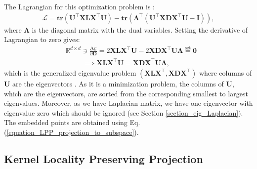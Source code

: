 \documentclass[lang=cn,10pt]{gorgeousnbook}
\numberwithin{equation}{section}%
\numberwithin{figure}{section}%
\begin{document}
The Lagrangian for this optimization problem is \cite{boyd2004convex}:
\begin{align*}
\mathcal{L} = \textbf{tr}(\boldsymbol{U}^\top \boldsymbol{X} \boldsymbol{L} \boldsymbol{X}^\top \boldsymbol{U}) - \textbf{tr}(\boldsymbol{\Lambda}^\top (\boldsymbol{U}^\top \boldsymbol{X} \boldsymbol{D} \boldsymbol{X}^\top \boldsymbol{U} - \boldsymbol{I})),
\end{align*}
where $\boldsymbol{\Lambda}$ is the diagonal matrix with the dual variables. Setting the derivative of Lagrangian to zero gives:
\begin{align}
&\mathbb{R}^{d \times d} \ni \frac{\partial \mathcal{L}}{\partial \boldsymbol{D}} = 2 \boldsymbol{X} \boldsymbol{L} \boldsymbol{X}^\top \boldsymbol{U} - 2 \boldsymbol{X} \boldsymbol{D} \boldsymbol{X}^\top \boldsymbol{U} \boldsymbol{\Lambda} \overset{\text{set}}{=} \boldsymbol{0} \nonumber \\
&~~~~~~~~~~~ \implies \boldsymbol{X} \boldsymbol{L} \boldsymbol{X}^\top \boldsymbol{U} = \boldsymbol{X} \boldsymbol{D} \boldsymbol{X}^\top \boldsymbol{U} \boldsymbol{\Lambda}, \label{equation_LPP_multi_solution}
\end{align}
which is the generalized eigenvalue problem $(\boldsymbol{X} \boldsymbol{L} \boldsymbol{X}^\top, \boldsymbol{X} \boldsymbol{D} \boldsymbol{X}^\top)$ where columns of $\boldsymbol{U}$ are the eigenvectors \cite{ghojogh2019eigenvalue}. 
As it is a minimization problem, the columns of $\boldsymbol{U}$, which are the eigenvectors, are sorted from the corresponding smallest to largest eigenvalues. Moreover, as we have Laplacian matrix, we have one eigenvector with eigenvalue zero which should be ignored (see Section \ref{section_eig_Laplacian}). 
The embedded points are obtained using Eq. (\ref{equation_LPP_projection_to_subspace}).

\subsection{Kernel Locality Preserving Projection}
\end{document}
